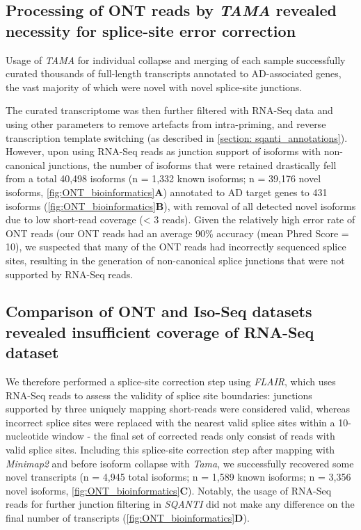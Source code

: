 \subsection{Processing of ONT reads by \textit{TAMA} revealed necessity for splice-site error correction}
Usage of \textit{TAMA} for individual collapse and merging of each sample successfully curated thousands of full-length transcripts annotated to AD-associated genes, the vast majority of which were novel with novel splice-site junctions. 

The curated transcriptome was then further filtered with RNA-Seq data and using other parameters to remove artefacts from intra-priming, and reverse transcription template switching (as described in \cref{section: sqanti_annotations}). However, upon using RNA-Seq reads as junction support of isoforms with non-canonical junctions, the number of isoforms that were retained drastically fell from a total 40,498 isoforms (n = 1,332 known isoforms; n = 39,176 novel isoforms, \cref{fig:ONT_bioinformatics}\textbf{A}) annotated to AD target genes to 431 isoforms (\cref{fig:ONT_bioinformatics}\textbf{B}), with removal of all detected novel isoforms due to low short-read coverage (< 3 reads). Given the relatively high error rate of ONT reads (our ONT reads had an average 90\% accuracy (mean Phred Score = 10), we suspected that many of the ONT reads had incorrectly sequenced splice sites, resulting in the generation of non-canonical splice junctions that were not supported by RNA-Seq reads.


\subsection{Comparison of ONT and Iso-Seq datasets revealed insufficient coverage of RNA-Seq dataset}
We therefore performed a splice-site correction step using \textit{FLAIR}\cite{Tang2020}, which uses RNA-Seq reads to assess the validity of splice site boundaries: junctions supported by three uniquely mapping short-reads were considered valid, whereas incorrect splice sites were replaced with the nearest valid splice sites within a 10-nucleotide window - the final set of corrected reads only consist of reads with valid splice sites\cite{Tang2020}. Including this splice-site correction step after mapping with \textit{Minimap2} and before isoform collapse with \textit{Tama}, we successfully recovered some novel transcripts (n = 4,945 total isoforms; n = 1,589 known isoforms; n = 3,356 novel isoforms, \cref{fig:ONT_bioinformatics}\textbf{C}). Notably, the usage of RNA-Seq reads for further junction filtering in \textit{SQANTI} did not make any difference on the final number of transcripts (\cref{fig:ONT_bioinformatics}\textbf{D}).  

